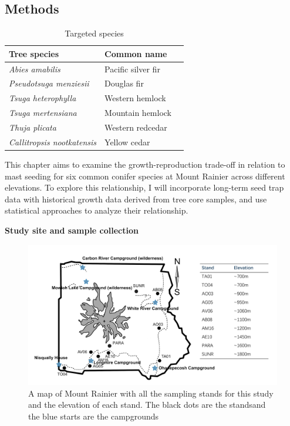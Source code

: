 \documentclass[11pt,letter]{article}
\begin{document}
\subsection{Methods}
\begin{table}[htb]
	\centering
	\small
	\caption{Targeted species}
\begin{tabular}{|p{5cm}|p{5cm}|p{5cm}|}
\hline
 Tree species & Common name\\ \hline %
\textit{Abies amabilis} & Pacific silver fir \\ \hline
\textit{Pseudotsuga menziesii} & Douglas fir\\ \hline
\textit{Tsuga heterophylla} & Western hemlock\\ \hline
\textit{Tsuga mertensiana} & Mountain hemlock\\ \hline
\textit{Thuja plicata} & Western redcedar\\ \hline
\textit{Callitropsis nootkatensis} & Yellow cedar\\ \hline
\end{tabular}
\end{table}
This chapter aims to examine the growth-reproduction trade-off in relation to mast seeding for six common conifer species at Mount Rainier across different elevations. To explore this relationship, I will incorporate long-term seed trap data with historical growth data derived from tree core samples, and use statistical approaches to analyze their relationship.\par
\textbf{Study site and sample collection}\\
\begin{figure}[htb]
	\centering
	\includegraphics[width=1\linewidth]{rainierMap.png}
	\caption{A map of Mount Rainier with all the sampling stands for this study and the elevation of each stand. The black dots are the standsand the blue starts are the campgrounds}
	\label{fig:sites}
\end{figure}\\
\end{document}
